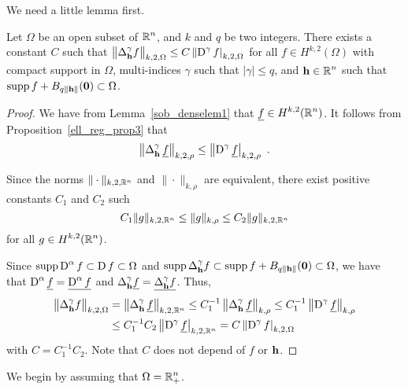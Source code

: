 We need a little lemma first.

\begin{lemma} \label{ellRegProp3Omega}
Let $\Omega$ be an open subset of $\displaystyle \mathbb{R}^n$, and $k$ and $q$ be two
integers.  There exists a constant $C$ such that
$\displaystyle \left\| \Delta^\gamma_{\mathbf{h}} f  \right\|_{k,2,\Omega}
\leq C \left\| \operatorname{D}^\gamma f\right|_{k,2,\Omega}$ for all
$\displaystyle f\in H^{k,2}(\Omega)$ with compact support in $\Omega$,
multi-indices $\gamma$ such that $|\gamma|\leq q$, and
$\displaystyle \mathbf{h} \in \mathbb{R}^n$ such that
$\displaystyle \operatorname{supp} f + B_{q\|\mathbf{h}\|}(\mathbf{0}) \subset \Omega$.
\end{lemma}

\begin{proof}
We have from Lemma~\ref{sob_denselem1} that
$\displaystyle \underline{f} \in H^{k,2}(\mathbb{R}^n)$.  It follows from
Proposition~\ref{ell_reg_prop3} that
\[
\left\| \Delta^\gamma_{\VEC{h}}\, \underline{f}  \right\|_{k,2,\rho}
\leq \left\| \diff^\gamma \underline{f}\right|_{k,2,\rho} \ .
\]

Since the norms $\|\cdot\|_{k,2,\mathbb{R}^n}$ and $\|\cdot\|_{k,\rho}$ are
equivalent, there exist positive constants $C_1$ and $C_2$ such
\[
  C_1 \|g\|_{k,2,\mathbb{R}^n} \leq \|g\|_{k,\rho} \leq C_2 \|g\|_{k,2,\mathbb{R}^n}
\]
for all $\displaystyle g \in H^{k,2}(\mathbb{R}^n)$.

Since $\displaystyle \operatorname{supp} \operatorname{D}^\alpha f \subset \operatorname{D} f
\subset \Omega$ and
$\displaystyle \operatorname{supp} \Delta^\gamma_{\mathbf{h}} f \subset
\operatorname{supp} f + B_{q\|\mathbf{h}\|}(\mathbf{0}) \subset \Omega$, we have that
$\displaystyle \operatorname{D}^\alpha \underline{f} = \underline{\operatorname{D}^\alpha f}$
and $\displaystyle \Delta^\gamma_{\mathbf{h}} \underline{f}
= \underline{\Delta^\gamma_{\mathbf{h}} f}$.  Thus,
\begin{align*}
\left\| \Delta^\gamma_{\mathbf{h}} f  \right\|_{k,2,\Omega}
&= \left\| \Delta^\gamma_{\mathbf{h}}\, \underline{f}  \right\|_{k,2,\mathbb{R}^n}
\leq C_1^{-1} \left\| \Delta^\gamma_{\mathbf{h}}\, \underline{f}  \right\|_{k,\rho}
\leq C_1^{-1} \left\| \operatorname{D}^\gamma \underline{f}  \right\|_{k,\rho} \\
&\leq C_1^{-1} C_2 \left\| \operatorname{D}^\gamma \underline{f} \right|_{k,2,\mathbb{R}^n}
= C \left\| \operatorname{D}^\gamma f \right|_{k,2,\Omega}
\end{align*}
with $C = C_1^{-1} C_2$.  Note that $C$ does not depend of $f$ or $\mathbf{h}$.
\end{proof}

We begin by assuming that $\displaystyle \Omega = \mathbb{R}^n_+$.

